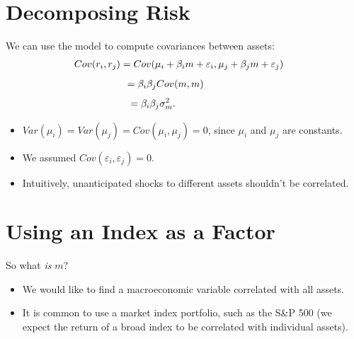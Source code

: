 \documentclass[letterpaper,10pt,english]{sphinxmanual}
\begin{document}
\section{Decomposing Risk}
\label{indexModels:id3}
We can use the model to compute covariances between assets:
\begin{gather}
\begin{split}Cov(r_i,r_j) & = Cov(\mu_i + \beta_i m + \varepsilon_i, \mu_j + \beta_j m + \varepsilon_j)\end{split}\notag
\end{gather}\begin{gather}
\begin{split}& = \beta_i \beta_j Cov(m,m) \qquad \quad\end{split}\notag
\end{gather}\begin{gather}
\begin{split}& = \beta_i \beta_j \sigma^2_m. \qquad \qquad \quad \enspace\end{split}\notag
\end{gather}\begin{itemize}
\item {} 
$Var(\mu_i) = Var(\mu_j) = Cov(\mu_i,\mu_j) = 0$, since $\mu_i$
and $\mu_j$ are constants.

\end{itemize}
\begin{itemize}
\item {} 
We assumed $Cov(\varepsilon_i, \varepsilon_j) = 0$.

\end{itemize}
\begin{itemize}
\item {} 
Intuitively, unanticipated shocks to different assets shouldn't be
correlated.

\end{itemize}


\section{Using an Index as a Factor}
\label{indexModels:using-an-index-as-a-factor}
So what \emph{is} $m$?
\begin{itemize}
\item {} 
We would like to find a macroeconomic variable correlated with all
assets.

\end{itemize}
\begin{itemize}
\item {} 
It is common to use a market index portfolio, such as the S\&P 500
(we expect the return of a broad index to be correlated with
individual assets).

\end{itemize}
\end{document}
